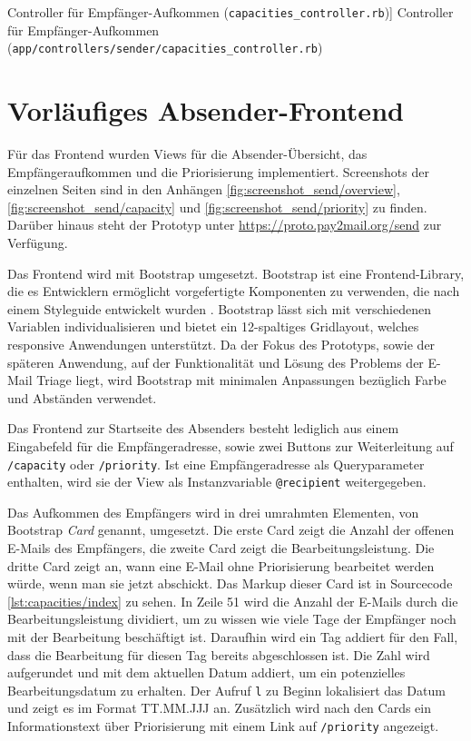 \begin{listing}[!ht]
\inputminted[linenos]{ruby}{Listings/capacities_controller.rb}

\caption
    [Controller für Empfänger-Aufkommen (\texttt{capacities\_controller.rb})]
    {Controller für Empfänger-Aufkommen (\texttt{app/controllers/sender/capacities\_controller.rb})}

\label{lst:capacities_controller}
\end{listing}

\section{Vorläufiges Absender-Frontend}
Für das Frontend wurden Views für die Absender-Übersicht, das Empfängeraufkommen und die Priorisierung implementiert. Screenshots der einzelnen Seiten sind in den Anhängen \ref{fig:screenshot_send/overview}, \ref{fig:screenshot_send/capacity} und \ref{fig:screenshot_send/priority} zu finden. Darüber hinaus steht der Prototyp unter \url{https://proto.pay2mail.org/send} zur Verfügung.

Das Frontend wird mit Bootstrap umgesetzt. Bootstrap ist eine Frontend-Library, die es Entwicklern ermöglicht vorgefertigte Komponenten zu verwenden, die nach einem Styleguide entwickelt wurden \citep{Twitter2022}. Bootstrap lässt sich mit verschiedenen Variablen individualisieren und bietet ein 12-spaltiges Gridlayout, welches responsive Anwendungen unterstützt. Da der Fokus des Prototyps, sowie der späteren Anwendung, auf der Funktionalität und Lösung des Problems der E-Mail Triage liegt, wird Bootstrap mit minimalen Anpassungen bezüglich Farbe und Abständen verwendet.

Das Frontend zur Startseite des Absenders besteht lediglich aus einem Eingabefeld für die Empfängeradresse, sowie zwei Buttons zur Weiterleitung auf \texttt{/capacity} oder \texttt{/priority}. Ist eine Empfängeradresse als Queryparameter enthalten, wird sie der View als Instanzvariable \texttt{@recipient} weitergegeben.

Das Aufkommen des Empfängers wird in drei umrahmten Elementen, von Bootstrap \textit{Card} genannt, umgesetzt. Die erste Card zeigt die Anzahl der offenen E-Mails des Empfängers, die zweite Card zeigt die Bearbeitungsleistung. Die dritte Card zeigt an, wann eine E-Mail ohne Priorisierung bearbeitet werden würde, wenn man sie jetzt abschickt. Das Markup dieser Card ist in Sourcecode \ref{lst:capacities/index} zu sehen. In Zeile 51 wird die Anzahl der E-Mails durch die Bearbeitungsleistung dividiert, um zu wissen wie viele Tage der Empfänger noch mit der Bearbeitung beschäftigt ist. Daraufhin wird ein Tag addiert für den Fall, dass die Bearbeitung für diesen Tag bereits abgeschlossen ist. Die Zahl wird aufgerundet und mit dem aktuellen Datum addiert, um ein potenzielles Bearbeitungsdatum zu erhalten. Der Aufruf \texttt{l} zu Beginn lokalisiert das Datum und zeigt es im Format TT.MM.JJJ an. Zusätzlich wird nach den Cards ein Informationstext über Priorisierung mit einem Link auf \texttt{/priority} angezeigt.

